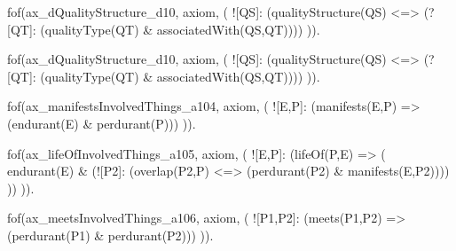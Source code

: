 






fof(ax_dQualityStructure_d10, axiom, (
  ![QS]: (qualityStructure(QS) <=> (?[QT]: (qualityType(QT) & associatedWith(QS,QT))))
)).

fof(ax_dQualityStructure_d10, axiom, (
  ![QS]: (qualityStructure(QS) <=> (?[QT]: (qualityType(QT) & associatedWith(QS,QT))))
)).


fof(ax_manifestsInvolvedThings_a104, axiom, (
  ![E,P]: (manifests(E,P) => (endurant(E) & perdurant(P)))
)).

fof(ax_lifeOfInvolvedThings_a105, axiom, (
  ![E,P]: (lifeOf(P,E) => (
    endurant(E)
    & (![P2]: (overlap(P2,P) <=> (perdurant(P2) & manifests(E,P2))))
  ))
)).


fof(ax_meetsInvolvedThings_a106, axiom, (
  ![P1,P2]: (meets(P1,P2) => (perdurant(P1) & perdurant(P2)))
)).

